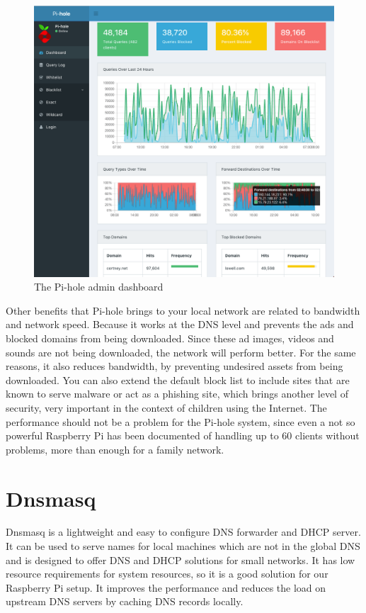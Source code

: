 \begin{figure}[th]
\centering
\includegraphics[width=1\textwidth]{Figures/pihole-admin}
\decoRule
\caption{The Pi-hole admin dashboard}
\label{fig:pihole-admin}
\end{figure}

Other benefits that Pi-hole brings to your local network are related to bandwidth and network speed. Because it works at the DNS level and prevents the ads and blocked domains from being downloaded. Since these ad images, videos and sounds are not being downloaded, the network will perform better. For the same reasons, it also reduces bandwidth, by preventing undesired assets from being downloaded. You can also extend the default block list to include sites that are known to serve malware or act as a phishing site, which brings another level of security, very important in the context of children using the Internet. The performance should not be a problem for the Pi-hole system, since even a not so powerful Raspberry Pi has been documented of handling up to 60 clients without problems, more than enough for a family network. \parencite{salmela20177things}

\section{Dnsmasq}

Dnsmasq is a lightweight and easy to configure DNS forwarder and DHCP server. It can be used to serve names for local machines which are not in the global DNS and is designed to offer DNS and DHCP solutions for small networks. \parencite{debianHowToDnsmasq}
It has low resource requirements for system resources, so it is a good solution for our Raspberry Pi setup. It improves the performance and reduces the load on upstream DNS servers by caching DNS records locally.

